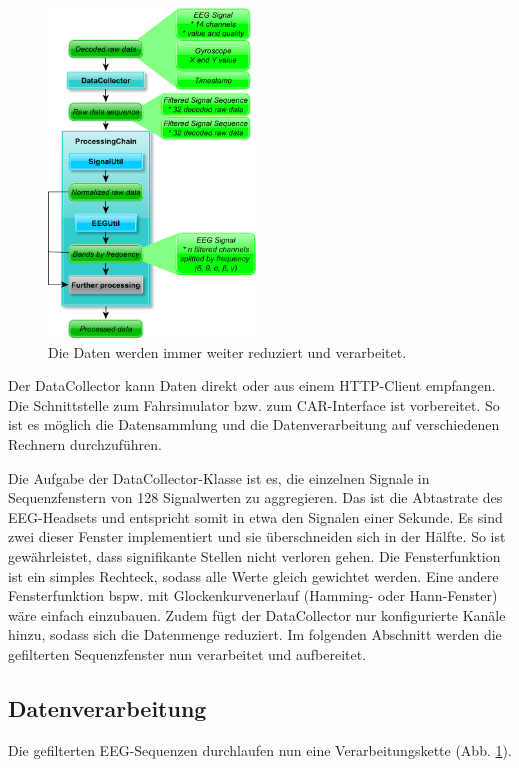 {\begin{figure}[h] 
  \begin{center}
    \includegraphics[width=5.5cm]{data_processing}
    \caption[Datenverarbeitung]{Die Daten werden immer weiter reduziert und verarbeitet. \label{fig:data_processing}}
  \end{center}
\end{figure}

Der DataCollector kann Daten direkt oder aus einem HTTP-Client empfangen. Die Schnittstelle zum Fahrsimulator bzw. zum CAR-Interface ist vorbereitet. So ist es möglich die Datensammlung und die Datenverarbeitung auf verschiedenen Rechnern durchzuführen.

Die Aufgabe der DataCollector-Klasse ist es, die einzelnen Signale in Sequenzfenstern von 128 Signalwerten zu aggregieren. Das ist die Abtastrate des EEG-Headsets und entspricht somit in etwa den Signalen einer Sekunde. Es sind zwei dieser Fenster implementiert und sie überschneiden sich in der Hälfte. So ist gewährleistet, dass signifikante Stellen nicht verloren gehen. Die Fensterfunktion ist ein simples Rechteck, sodass alle Werte gleich gewichtet werden. Eine andere Fensterfunktion bspw. mit Glockenkurvenerlauf (Hamming- oder Hann-Fenster) wäre einfach einzubauen. Zudem fügt der DataCollector nur konfigurierte Kanäle hinzu, sodass sich die Datenmenge reduziert. Im folgenden Abschnitt werden die gefilterten Sequenzfenster nun verarbeitet und aufbereitet.


\subsection{Datenverarbeitung}
\label{sec:processing}
Die gefilterten EEG-Sequenzen durchlaufen nun eine Verarbeitungskette (Abb. \ref{fig:data_processing}). 

}
